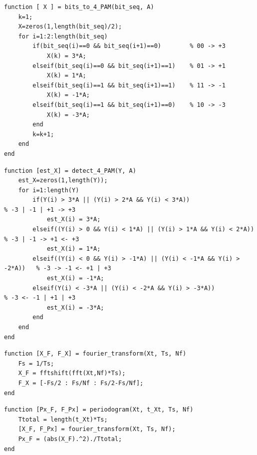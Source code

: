 \documentclass[11pt]{article}
\begin{document}
    \begin{lstlisting}[caption = {\texttt{bits\_to\_4\_PAM.m}}]
function [ X ] = bits_to_4_PAM(bit_seq, A)
    k=1;
    X=zeros(1,length(bit_seq)/2);
    for i=1:2:length(bit_seq)
        if(bit_seq(i)==0 && bit_seq(i+1)==0)        % 00 -> +3
            X(k) = 3*A;
        elseif(bit_seq(i)==0 && bit_seq(i+1)==1)    % 01 -> +1
            X(k) = 1*A;
        elseif(bit_seq(i)==1 && bit_seq(i+1)==1)    % 11 -> -1
            X(k) = -1*A;
        elseif(bit_seq(i)==1 && bit_seq(i+1)==0)    % 10 -> -3
            X(k) = -3*A;
        end
        k=k+1;
    end
end
    \end{lstlisting}
    \begin{lstlisting}[caption = {\texttt{detect\_4\_PAM.m}}]
function [est_X] = detect_4_PAM(Y, A)
    est_X=zeros(1,length(Y));
    for i=1:length(Y)
        if(Y(i) > 3*A || (Y(i) > 2*A && Y(i) < 3*A))                        % -3 | -1 | +1 -> +3
            est_X(i) = 3*A;
        elseif((Y(i) > 0 && Y(i) < 1*A) || (Y(i) > 1*A && Y(i) < 2*A))      % -3 | -1 -> +1 <- +3
            est_X(i) = 1*A;
        elseif((Y(i) < 0 && Y(i) > -1*A) || (Y(i) < -1*A && Y(i) > -2*A))   % -3 -> -1 <- +1 | +3
            est_X(i) = -1*A;
        elseif(Y(i) < -3*A || (Y(i) < -2*A && Y(i) > -3*A))                 % -3 <- -1 | +1 | +3
            est_X(i) = -3*A;
        end
    end
end
    \end{lstlisting}
     \begin{lstlisting}[caption = {\texttt{fourier\_transform.m}}]
function [X_F, F_X] = fourier_transform(Xt, Ts, Nf)
    Fs = 1/Ts;
    X_F = fftshift(fft(Xt,Nf)*Ts);
    F_X = [-Fs/2 : Fs/Nf : Fs/2-Fs/Nf];
end
    \end{lstlisting}
    \begin{lstlisting}[caption = {\texttt{periodogram.m}}]
function [Px_F, F_Px] = periodogram(Xt, t_Xt, Ts, Nf)
    Ttotal = length(t_Xt)*Ts;
    [X_F, F_Px] = fourier_transform(Xt, Ts, Nf);
    Px_F = (abs(X_F).^2)./Ttotal;
end
    \end{lstlisting}
    
\end{document}

